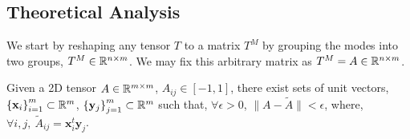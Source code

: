 \subsection{Theoretical Analysis}
We start by reshaping any tensor $T$ to a matrix $T^M$ by grouping the modes into two groups, $T^M \in \mathbb{R}^{n \times m}$. We may fix this arbitrary matrix as $T^M = A \in \mathbb{R}^{n \times m}$.

\begin{proposition}
\label{theory:prop1}
Given a 2D tensor $A\in \mathbb{R}^{m\times m}$, $A_{ij} \in [-1,1]$, there exist sets of unit vectors, $\left\{\mathbf{x}_i\right\}_{i=1}^m\subset \mathbb{R}^m$, $\left\{\mathbf{y}_j\right\}_{j=1}^m\subset \mathbb{R}^m$ such that, $\forall \epsilon > 0$, $\|A - \widetilde{A}\| < \epsilon$, where, $\forall i,j,\: \widetilde{A}_{ij}=\mathbf{x}_i^t\mathbf{y}_j$.
\end{proposition}
